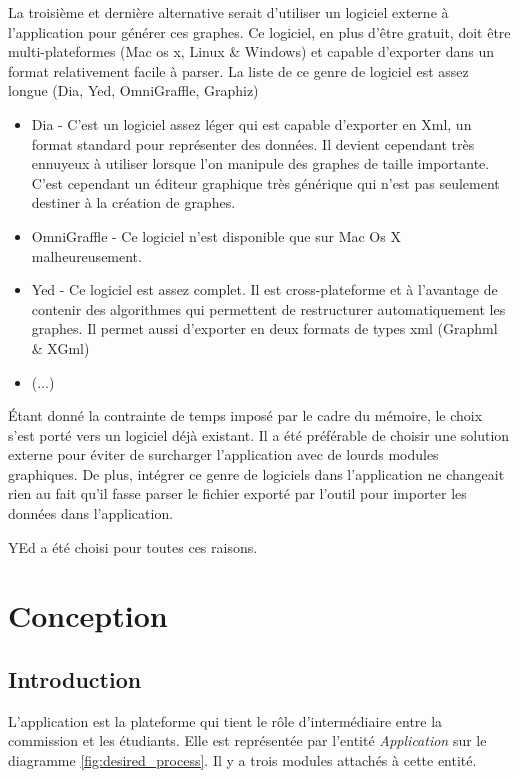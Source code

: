 La troisième et dernière alternative serait d'utiliser un logiciel externe à l'application pour générer ces graphes. Ce logiciel, en plus d'être gratuit, doit être multi-plateformes (Mac os x, Linux \& Windows) et capable d'exporter dans un format relativement facile à parser. La liste de ce genre de logiciel est assez longue (Dia, Yed, OmniGraffle, Graphiz)
\begin{itemize}
  \item Dia - C'est un logiciel assez léger qui est capable d'exporter en Xml, un format standard pour représenter des données. Il devient cependant très ennuyeux à utiliser lorsque l'on manipule des graphes de taille importante. C'est cependant un éditeur graphique très générique qui n'est pas seulement destiner à la création de graphes. 
  \item OmniGraffle - Ce logiciel n'est disponible que sur Mac Os X malheureusement.
  \item Yed - Ce logiciel est assez complet. Il est cross-plateforme et à l'avantage de contenir des algorithmes qui permettent de restructurer automatiquement les graphes. Il permet aussi d'exporter en deux formats de types xml (Graphml \& XGml)
  \item (...)
\end{itemize}

Étant donné la contrainte de temps imposé par le cadre du mémoire, le choix s'est porté vers un logiciel déjà existant. Il a été préférable de choisir une solution externe pour éviter de surcharger l'application avec de lourds modules graphiques. De plus, intégrer ce genre de logiciels dans l'application ne changeait rien au fait qu'il fasse parser le fichier exporté par l'outil pour importer les données dans l'application.

YEd a été choisi pour toutes ces raisons. 
\clearpage
\section{Conception}
\subsection{Introduction}
 
L'application est la  plateforme qui tient le rôle d'intermédiaire entre la commission et les étudiants. Elle est représentée par l'entité \textit{Application} sur le diagramme \ref{fig:desired_process}. Il y a trois modules attachés à cette entité.

